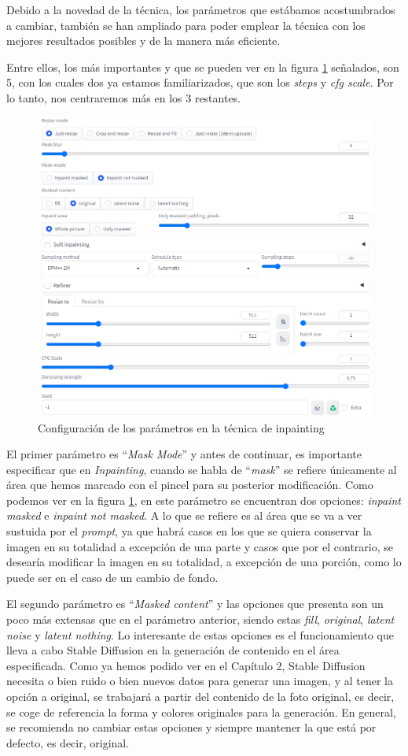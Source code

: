 \begin{itemize}
Debido a la novedad de la técnica, los parámetros que estábamos acostumbrados a cambiar, también se han ampliado para poder emplear la técnica con los mejores resultados posibles y de la manera más eficiente. 

Entre ellos, los más importantes y que se pueden ver en la figura \ref{fig:paramsinpainting} señalados, son 5, con los cuales dos ya estamos familiarizados, que son los \textit{steps} y \textit{cfg scale}. Por lo tanto, nos centraremos más en los 3 restantes. 

\begin{figure}[h]
	\centering
	\includegraphics[width = 0.6
	\textwidth]{Imagenes/Vectorial/parametrosinpainting.png}
	\caption{Configuración de los parámetros en la técnica de inpainting}
	\label{fig:paramsinpainting}
\end{figure}

El primer parámetro es ``\textit{Mask Mode}'' y antes de continuar, es importante especificar que en \textit{Inpainting}, cuando se habla de ``\textit{mask}'' se refiere únicamente al área que hemos marcado con el pincel para su posterior modificación. Como podemos ver en la figura \ref{fig:paramsinpainting}, en este parámetro se encuentran dos opciones: \textit{inpaint masked} e \textit{inpaint not masked}. A lo que se refiere es al área que se va a ver sustuida por el \textit{prompt}, ya que habrá casos en los que se quiera conservar la imagen en su totalidad a excepción de una parte y casos que por el contrario, se desearía modificar la imagen en su totalidad, a excepción de una porción, como lo puede ser en el caso de un cambio de fondo. 

El segundo parámetro es ``\textit{Masked content}'' y las opciones que presenta son un poco más extensas que en el parámetro anterior, siendo estas \textit{fill}, \textit{original}, \textit{latent noise} y \textit{latent nothing}. Lo interesante de estas opciones es el funcionamiento que lleva a cabo Stable Diffusion en la generación de contenido en el área especificada. Como ya hemos podido ver en el Capítulo 2, Stable Diffusion necesita o bien ruido o bien nuevos datos para generar una imagen, y al tener la opción a original, se trabajará a partir del contenido de la foto original, es decir, se coge de referencia la forma y colores originales para la generación. En general, se recomienda no cambiar estas opciones y siempre mantener la que está por defecto, es decir, original. 


\end{itemize}
